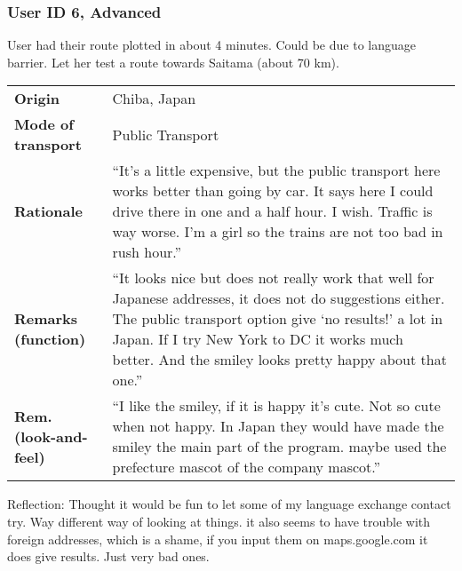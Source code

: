 \documentclass[final,a4paper,11pt]{article}
\newlength{\resulttablecolone}
\newlength{\resulttablecoltwo}
\begin{document}
\subsubsection*{User ID 6, Advanced}
User had their route plotted in about 4 minutes. Could be due to language barrier. Let her test a route towards Saitama (about 70 km).
\begin{table}[H]
\begin{tabular}{p{\resulttablecolone}|p{\resulttablecoltwo}}
\textbf{Origin} & Chiba, Japan \\
\textbf{Mode of transport} & Public Transport \\
\textbf{Rationale} & ``It's a little expensive, but the public transport here works better than going by car. It says here I could drive there in  one and a half hour. I wish. Traffic is way worse. I'm a girl so the trains are not too bad in rush hour.'' \\
\textbf{Remarks (function)} & ``It looks nice but does not really work that well for Japanese addresses, it does not do suggestions either. The public transport option give `no results!' a lot in Japan. If I try New York to DC it works much better. And the smiley looks pretty happy about that one.'' \\
\textbf{Rem. (look-and-feel)} & ``I like the smiley, if it is happy it's cute. Not so cute when not happy. In Japan they would have made the smiley the main part of the program. maybe used the prefecture mascot of the company mascot.'' \\
\end{tabular}
\end{table}
Reflection: Thought it would be fun to let some of my language exchange contact try. Way different way of looking at things. it also seems to have trouble with foreign addresses, which is a shame, if you input them on maps.google.com it does give results. Just very bad ones.
\end{document}
